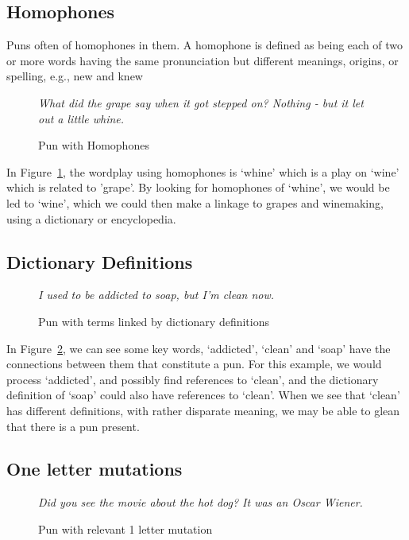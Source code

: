 \subsection{Homophones}
Puns often of homophones in them. A homophone is defined as being each of two or more words having the same pronunciation but different meanings, origins, or spelling, e.g., new and knew

\begin{figure}[h]
\begin{mdframed}
  \emph{What did the grape say when it got stepped on? Nothing - but it let out a little whine.}
  \caption{Pun with Homophones}
 \label{punhomophone}
\end{mdframed}
\end{figure}

In Figure~\ref{punhomophone}, the wordplay using homophones is `whine' which is a play on `wine' which is related to 'grape'. By looking for homophones of `whine', we would be led to `wine', which we could then make a linkage to grapes and winemaking, using a dictionary or encyclopedia.

\subsection{Dictionary Definitions}

\begin{figure}[h]
\begin{mdframed}
  \emph{I used to be addicted to soap, but I'm clean now.}
  \caption{Pun with terms linked by dictionary definitions}
 \label{addicted}
\end{mdframed}
\end{figure}

In Figure~\ref{addicted}, we can see some key words, `addicted', `clean' and `soap' have the connections between them that constitute a pun. For this example, we would process `addicted', and possibly find references to `clean', and the dictionary definition of `soap' could also have references to `clean'. When we see that `clean' has different definitions, with rather disparate meaning, we may be able to glean that there is a pun present.

\subsection{One letter mutations}

\begin{figure}[h]
\begin{mdframed}
  \emph{Did you see the movie about the hot dog? It was an Oscar Wiener.}
  \caption{Pun with relevant 1 letter mutation}
 \label{punmutation}
\end{mdframed}
\end{figure}

